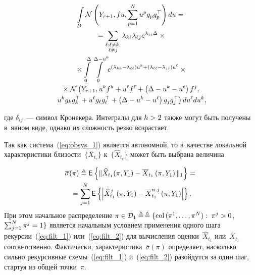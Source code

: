 \begin{multicols}{2}
 \noindent
 \begin{multline}
 \int\limits_D \mathcal{N}\left( 
Y_{r+1},f u,\sum\limits_{p=1}^N u^p g_pg_p^{\top}\right)du ={}\\[-1pt]
{}=
\sum\limits_{\substack{{\ell:\ell \neq k,}\\ {\ell \neq j}}}
 \lambda_{k\ell}\lambda_{\ell j} e^{\lambda_{jj}\Delta}\times {}\\[-1pt] 
 {}\times
 \int\limits_0^{\Delta} \int\limits_0^{\Delta-u^k} \!
e^{(\lambda_{kk}-\lambda_{\ell\ell})u^k+(\lambda_{\ell\ell}-
 \lambda_{jj})u^{\ell}}\times{} \\[-1pt] 
{}  \times
 \mathcal{N}\left(Y_{r+1},u^k f^k+u^{\ell}f^{\ell}+\left(
 \Delta-u^k-u^{\ell} \right)f^j,\right.\\[-1pt]
 \hspace*{-1mm}\left.
 u^k g_kg_k^{\top}+u^{\ell}g_{\ell}g_{\ell}^{\top}+\left(
 \Delta-u^k-u^{\ell} \right)
 g_jg_j^{\top}
 \right) du^{\ell}du^{k}, \!\!
  \label{eq:h2}
 \end{multline} 
 
\vspace*{-2pt}
 
 \noindent
  где  $\delta_{ij}$~--- символ Кронекера. Интегралы для $h\hm>2$ также могут 
  быть получены в~явном виде, однако их сложность резко возрастает.
 

   Так как система~(\ref{eq:obsys_1}) является автономной, то в~качестве локальной 
   характеристики бли\-зости~$\{\overline{X}_{t_r}\}$ 
   к~$\{\widehat{X}_{t_r}\}$ может быть выбрана величина
   
\noindent
 \begin{multline*}
 \overline{\sigma}(\pi) \triangleq {\sf E}\left\{
 \|\widehat{X}_{t_{1}}(\pi, Y_{1}) - \overline{X}_{t_{1}}
 \left(\pi,Y_{1}\right)\|_{1}\right\} = {}\\
 {}=
 \sum\limits_{j=1}^N{\sf E}
 \left\{\left\vert \widehat{X}^j_{t_{1}}\left(\pi, Y_{1}\right) - \overline{X}^{n,j}_{t_{1}}
 \left(\pi,Y_{1}\right)\right\vert\right\}.
 \end{multline*}
 При этом начальное распределение $\pi \hm\in \mathcal{D}_1 \ebd $\linebreak $\triangleq
 \{\mathrm{col}\,(\pi^1,\ldots,\pi^N):\;\pi^j > 0$, 
 $\sum\nolimits_{j=1}^N\pi^j\hm=1\}$ является начальным условием применения 
 одного шага рекурсии~(\ref{eq:filt_1}) или~(\ref{eq:filt_2}) для вычисления 
 оценки~$\widehat{X}_{t_{1}}$
   или~$\overline{X}_{t_{1}}$ соответственно. Фактически, 
 характеристика~$\overline{\sigma}(\pi)$ определяет, насколько сильно 
 рекурсивные схемы~(\ref{eq:filt_1}) и~(\ref{eq:filt_2}) разойдутся за 
 один шаг, стартуя из общей точки~$\pi$.
 

\end{multicols}
